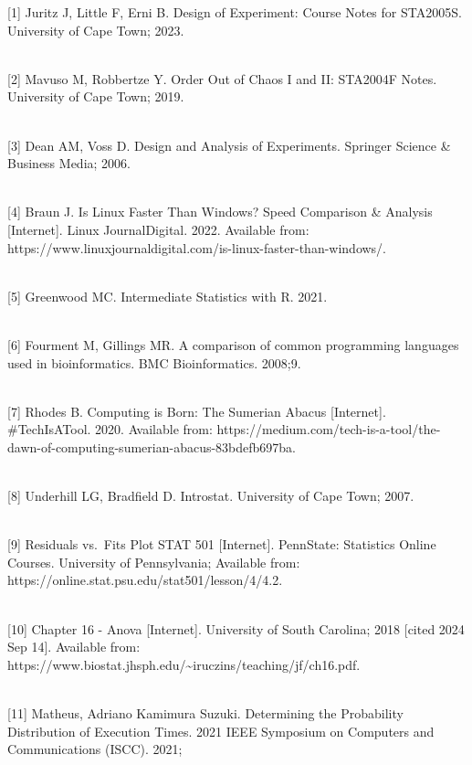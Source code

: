 \documentclass[12pt,halfline,a4paper,]{ouparticle}
\begin{document}
{[}1{]} Juritz J, Little F, Erni B. Design of Experiment: Course Notes
for STA2005S. University of Cape Town; 2023.\\
\strut \\
{[}2{]} Mavuso M, Robbertze Y. Order Out of Chaos I and II: STA2004F
Notes. University of Cape Town; 2019.\\
\strut \\
{[}3{]} Dean AM, Voss D. Design and Analysis of Experiments. Springer
Science \& Business Media; 2006.\\
\strut \\
{[}4{]} Braun J. Is Linux Faster Than Windows? Speed Comparison \&
Analysis {[}Internet{]}. Linux JournalDigital. 2022. Available from:
https://www.linuxjournaldigital.com/is-linux-faster-than-windows/.\\
\strut \\
{[}5{]} Greenwood MC. Intermediate Statistics with R. 2021.\\
\strut \\
{[}6{]} Fourment M, Gillings MR. A comparison of common programming
languages used in bioinformatics. BMC Bioinformatics. 2008;9.\\
\strut \\
{[}7{]} Rhodes B. Computing is Born: The Sumerian Abacus {[}Internet{]}.
\#TechIsATool. 2020. Available from:
https://medium.com/tech-is-a-tool/the-dawn-of-computing-sumerian-abacus-83bdefb697ba.\\
\strut \\
{[}8{]} Underhill LG, Bradfield D. Introstat. University of Cape Town;
2007.\\
\strut \\
{[}9{]} Residuals vs.~Fits Plot \textbar{} STAT 501 {[}Internet{]}.
PennState: Statistics Online Courses. University of Pennsylvania;
Available from: https://online.stat.psu.edu/stat501/lesson/4/4.2.\\
\strut \\
{[}10{]} Chapter 16 - Anova {[}Internet{]}. University of South
Carolina; 2018 {[}cited 2024 Sep 14{]}. Available from:
https://www.biostat.jhsph.edu/\textasciitilde iruczins/teaching/jf/ch16.pdf.\\
\strut \\
{[}11{]} Matheus, Adriano Kamimura Suzuki. Determining the Probability
Distribution of Execution Times. 2021 IEEE Symposium on Computers and
Communications (ISCC). 2021;
\end{document}

